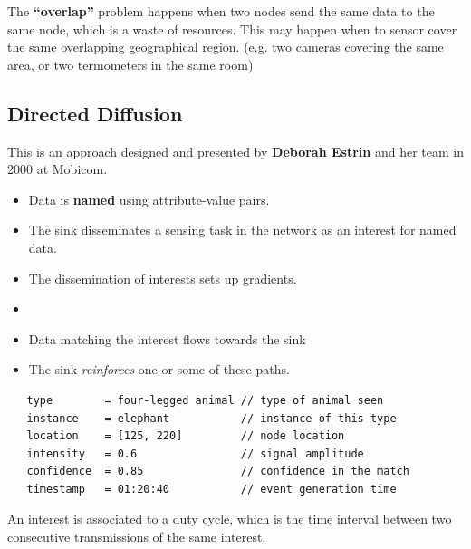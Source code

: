 The \textbf{``overlap''} problem happens when two nodes send the same data to the same node, which is a waste of resources. 
This may happen when to sensor cover the same overlapping geographical region. (e.g. two cameras covering the same area, or two termometers in the same room)

\subsection{Directed Diffusion}
This is an approach designed and presented by \textbf{Deborah Estrin} and her team in 2000 at Mobicom.

\begin{itemize}
   \item Data is \textbf{named} using attribute-value pairs.
   \item The sink disseminates a sensing task in the network as an interest for named data.
   \item The dissemination of interests sets up gradients.
   \item {}
   \item Data matching the interest flows towards the sink
   \item The sink \textit{reinforces} one or some of these paths.
\end{itemize}

\begin{lstlisting}
   type        = four-legged animal // type of animal seen
   instance    = elephant           // instance of this type
   location    = [125, 220]         // node location
   intensity   = 0.6                // signal amplitude
   confidence  = 0.85               // confidence in the match
   timestamp   = 01:20:40           // event generation time
\end{lstlisting}

An interest is associated to a duty cycle, which is the time interval between two consecutive transmissions of the same interest.

